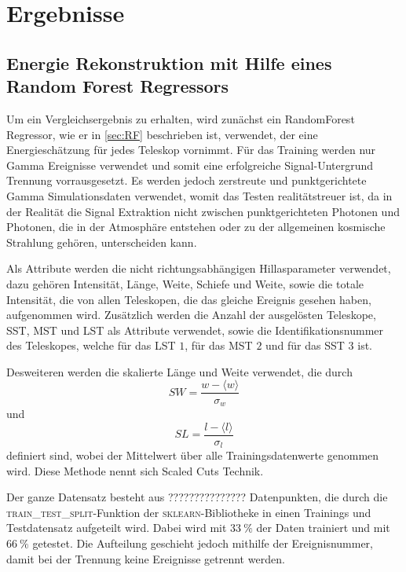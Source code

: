 \chapter{Ergebnisse}

\section{Energie Rekonstruktion mit Hilfe eines Random Forest Regressors}

Um ein Vergleichsergebnis zu erhalten, wird zunächst ein RandomForest Regressor, wie er in \autoref{sec:RF} beschrieben ist, verwendet,
der eine Energieschätzung für jedes Teleskop vornimmt.
Für das Training werden nur Gamma Ereignisse verwendet und somit eine erfolgreiche Signal-Untergrund Trennung vorrausgesetzt.
Es werden jedoch zerstreute und punktgerichtete Gamma Simulationsdaten verwendet, womit das Testen realitätstreuer ist, da in der
Realität die Signal Extraktion nicht zwischen punktgerichteten Photonen und Photonen, die in der Atmosphäre entstehen oder zu der
allgemeinen kosmische Strahlung gehören, unterscheiden kann.

Als Attribute werden die nicht richtungsabhängigen Hillasparameter verwendet, dazu gehören Intensität, Länge, Weite, Schiefe und Weite, sowie
die totale Intensität, die von allen Teleskopen, die das gleiche Ereignis gesehen haben, aufgenommen wird.
Zusätzlich werden die Anzahl der ausgelösten Teleskope, SST, MST und LST als Attribute verwendet, sowie die Identifikationsnummer des
Teleskopes, welche für das LST $1$, für das MST $2$ und für das SST $3$ ist.

Desweiteren werden die skalierte Länge und Weite verwendet, die durch
\begin{equation}
  SW = \frac{w- \langle w \rangle}{\sigma_w}
\end{equation}
und
\begin{equation}
  SL = \frac{l - \langle l \rangle}{\sigma_l}
\end{equation}
definiert sind, wobei der Mittelwert über alle Trainingsdatenwerte genommen wird. Diese Methode nennt sich Scaled Cuts Technik.\cite[104]{HESS}

Der ganze Datensatz besteht aus ??????????????? Datenpunkten, die durch die \textsc{train\_test\_split}-Funktion der \textsc{sklearn}-Bibliotheke
in einen Trainings und Testdatensatz aufgeteilt wird. Dabei wird mit $\SI{33}{\percent}$ der Daten trainiert und mit $\SI{66}{\percent}$
getestet. Die Aufteilung geschieht jedoch mithilfe der Ereignisnummer, damit bei der Trennung keine Ereignisse getrennt werden.

